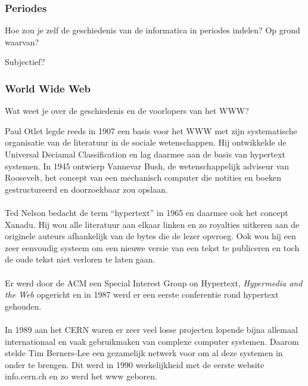 \documentclass[../main.tex]{subfiles}
\begin{document}
\subsubsection{Periodes}
\begin{question}
Hoe zou je zelf de geschiedenis van de informatica in periodes indelen? Op grond waarvan?
\end{question}
\begin{solution} Subjectief?
\end{solution}

\subsubsection{World Wide Web}
\begin{question}
Wat weet je over de geschiedenis en de voorlopers van het WWW?
\end{question}
\begin{solution}
Paul Otlet legde reeds in 1907 een basis voor het WWW met zijn systematische organisatie van de literatuur in de sociale wetenschappen.
Hij ontwikkelde de Universal Deciamal Classification en lag daarmee aan de basis van hypertext systemen.
In 1945 ontwierp Vannevar Bush, de wetenschappelijk adviseur van Roosevelt, het concept van een mechanisch  computer die notities en boeken gestructureerd en doorzoekbaar zou opslaan.
\\\\
Ted Nelson bedacht de term ``hypertext'' in 1965 en daarmee ook het concept Xanadu.
Hij wou alle literatuur aan elkaar linken en zo royalties uitkeren aan de originele auteurs afhankelijk van de bytes die de lezer opvroeg.
Ook wou hij een zeer eenvoudig systeem om een nieuwe versie van een tekst te publiceren en toch de oude tekst niet verloren te laten gaan.
\\\\
Er werd door de ACM een Special Interest Group on Hypertext, \emph{Hypermedia and the Web} opgericht en in 1987 werd er een eerste conferentie rond hypertext gehouden.
\\\\
In 1989 aan het CERN waren er zeer veel losse projecten lopende bijna allemaal internationaal en vaak gebruikmaken van complexe computer systemen.
Daarom stelde Tim Berners-Lee een gezamelijk netwerk voor om al deze systemen in onder te brengen.
Dit werd in 1990 werkelijkheid met de eerste website info.cern.ch en zo werd het www geboren.
\end{solution}
\end{document}
